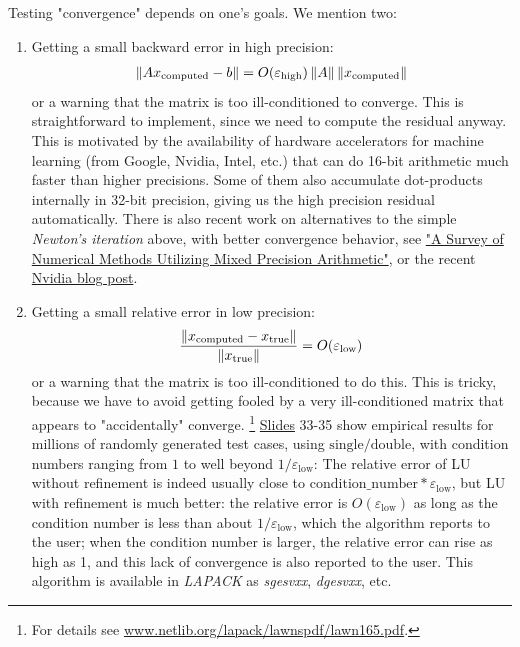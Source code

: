 \documentclass[11pt]{article}
\numberwithin{equation}{section}
\begin{document}
Testing "convergence" depends on one's goals. We mention two: \begin{enumerate}
    \item Getting a small backward error in high precision: \begin{align*}
        \left\| Ax_{\mathrm{computed}} - b \right\| = O(\varepsilon_{\mathrm{high}}) \left\| A \right\| \left\| x_{\mathrm{computed}} \right\|
    \end{align*}
   or a warning that the matrix is too ill-conditioned to converge. This is straightforward to implement, since we need to compute the residual anyway. 
   This is motivated by the availability of hardware accelerators for machine learning (from Google, Nvidia, Intel, etc.) 
   that can do 16-bit arithmetic much faster than higher precisions.  Some of them also accumulate dot-products internally in 32-bit precision, 
   giving us the high precision residual automatically. There is also recent work on alternatives to the simple \textit{Newton's iteration} above, 
   with better convergence behavior, see \href{https://arxiv.org/abs/2007.06674}{"A Survey of Numerical Methods Utilizing Mixed Precision Arithmetic"},
   or the recent \href{https://developer.nvidia.com/blog/tensor-cores-mixed-precision-scientific-computing/}{Nvidia blog post}.
   \item Getting a small relative error in low precision: \begin{align*}
    \frac{\left\| x_{\mathrm{computed}} - x_{\mathrm{true}} \right\|}{\left\| x_{\mathrm{true}} \right\|} = O(\varepsilon_{\mathrm{low}})
   \end{align*}
  or a warning that the matrix is too ill-conditioned to do this. This is tricky, 
  because we have to avoid getting fooled by a very ill-conditioned matrix that appears to "accidentally" converge. \footnote{For details see \url{www.netlib.org/lapack/lawnspdf/lawn165.pdf}.}
  \href{www.cs.berkeley.edu/~demmel/Future_Sca-LAPACK_v7.ppt}{Slides} 33-35 show empirical results for millions of randomly generated test cases, 
  using $\mathrm{single}/\mathrm{double}$, with condition numbers ranging from $1$ to well beyond $1/\varepsilon_{\mathrm{low}}$: 
  The relative error of LU without refinement is indeed usually close to $\mathrm{condition\_number} * \varepsilon_{\mathrm{low}}$,
  but LU with refinement is much better: the relative error is $O(\varepsilon_{\mathrm{low}})$ as long as the condition number is less than about
  $1/\varepsilon_{\mathrm{low}}$, which the algorithm reports to the user; when the condition number is larger, the relative error can rise as high as 1, 
  and this lack of convergence is also reported to the user. This algorithm is available in \textit{LAPACK} as \textit{sgesvxx}, \textit{dgesvxx}, etc.
\end{enumerate}
\end{document}

